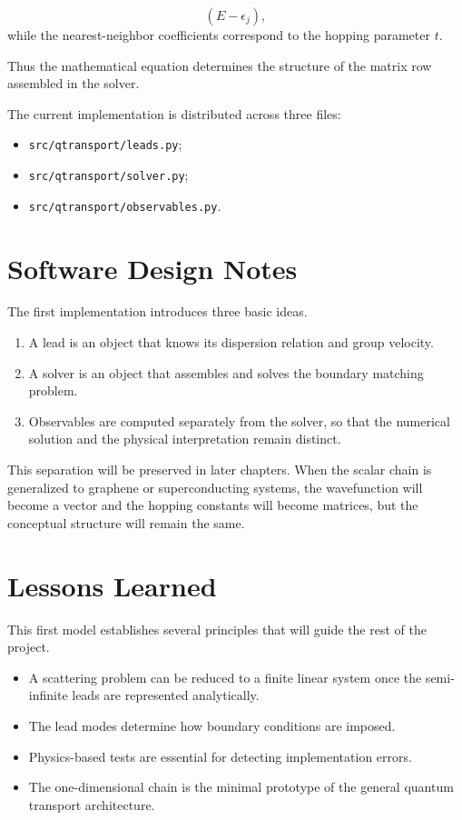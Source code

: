 \begin{equation}
	(E-\epsilon_j),
\end{equation}
while the nearest-neighbor coefficients correspond to the hopping
parameter $t$.

Thus the mathematical equation determines the structure of the matrix
row assembled in the solver.

The current implementation is distributed across three files:

\begin{itemize}
	\item \texttt{src/qtransport/leads.py};
	\item \texttt{src/qtransport/solver.py};
	\item \texttt{src/qtransport/observables.py}.
\end{itemize}

\section{Software Design Notes}

The first implementation introduces three basic ideas.

\begin{enumerate}
	\item A lead is an object that knows its dispersion relation and
	      group velocity.

	\item A solver is an object that assembles and solves the boundary
	      matching problem.

	\item Observables are computed separately from the solver, so that
	      the numerical solution and the physical interpretation remain
	      distinct.
\end{enumerate}

This separation will be preserved in later chapters. When the scalar
chain is generalized to graphene or superconducting systems, the
wavefunction will become a vector and the hopping constants will become
matrices, but the conceptual structure will remain the same.

\section{Lessons Learned}

This first model establishes several principles that will guide the rest
of the project.

\begin{itemize}
	\item A scattering problem can be reduced to a finite linear system
	      once the semi-infinite leads are represented analytically.

	\item The lead modes determine how boundary conditions are imposed.

	\item Physics-based tests are essential for detecting implementation
	      errors.

	\item The one-dimensional chain is the minimal prototype of the
	      general quantum transport architecture.
\end{itemize}
